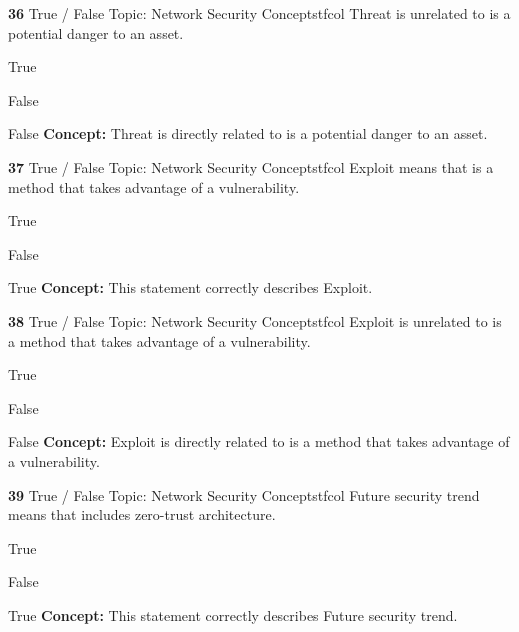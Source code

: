 \documentclass[10pt,a4paper]{article}
\begin{document}
\begin{qcard}{\color{white}\textbf{36} \hfill \small True / False \textbar{} Topic: Network Security Concepts}{tfcol}
Threat is unrelated to is a potential danger to an asset.

\begin{qoptions}
\item True
\item False
\end{qoptions}
\begin{explainbox}{False}
\textbf{Concept:} Threat is directly related to is a potential danger to an asset.
\end{explainbox}
\end{qcard}

\begin{qcard}{\color{white}\textbf{37} \hfill \small True / False \textbar{} Topic: Network Security Concepts}{tfcol}
Exploit means that is a method that takes advantage of a vulnerability.

\begin{qoptions}
\item True
\item False
\end{qoptions}
\begin{explainbox}{True}
\textbf{Concept:} This statement correctly describes Exploit.
\end{explainbox}
\end{qcard}

\begin{qcard}{\color{white}\textbf{38} \hfill \small True / False \textbar{} Topic: Network Security Concepts}{tfcol}
Exploit is unrelated to is a method that takes advantage of a vulnerability.

\begin{qoptions}
\item True
\item False
\end{qoptions}
\begin{explainbox}{False}
\textbf{Concept:} Exploit is directly related to is a method that takes advantage of a vulnerability.
\end{explainbox}
\end{qcard}

\begin{qcard}{\color{white}\textbf{39} \hfill \small True / False \textbar{} Topic: Network Security Concepts}{tfcol}
Future security trend means that includes zero-trust architecture.

\begin{qoptions}
\item True
\item False
\end{qoptions}
\begin{explainbox}{True}
\textbf{Concept:} This statement correctly describes Future security trend.
\end{explainbox}
\end{qcard}
\end{document}
